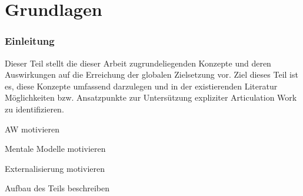 \part{Grundlagen} %
\label{prt:grundlagen}

\section*{Einleitung} %
\label{sec:grundlagen_einleitung}
\thispagestyle{empty}

Dieser Teil stellt die dieser Arbeit zugrundeliegenden Konzepte und deren Auswirkungen auf die Erreichung der globalen Zielsetzung vor. Ziel dieses Teil ist es, diese Konzepte umfassend darzulegen und in der existierenden Literatur Möglichkeiten bzw. Ansatzpunkte zur Untersützung expliziter Articulation Work zu identifizieren.

AW motivieren

Mentale Modelle motivieren

Externalisierung motivieren

Aufbau des Teils beschreiben






